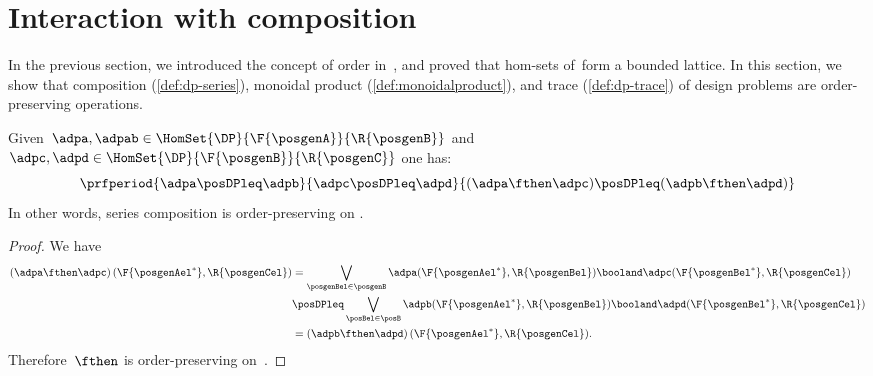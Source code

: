 
\section{Interaction with composition}
In the previous section, we introduced the concept of order in~\DP, and proved that hom-sets of~\DP form a bounded lattice.
In this section, we show that composition (\cref{def:dp-series}), monoidal product (\cref{def:monoidalproduct}), and trace (\cref{def:dp-trace}) of design problems are order-preserving operations.

\begin{lemma}
    \label{lem:series_pres_order}
    Given~$\adpa,\adpab \in \HomSet{\DP}{\F{\posgenA}}{\R{\posgenB}}$ and~$\adpc,\adpd \in \HomSet{\DP}{\F{\posgenB}}{\R{\posgenC}}$ one has:
    \begin{equation}
        \prfperiod{
            \adpa\posDPleq \adpb
        }{
            \adpc\posDPleq \adpd
        }{
            (\adpa\fthen \adpc) \posDPleq (\adpb\fthen \adpd)
        }
    \end{equation}
    In other words, series composition is order-preserving on \DP.
\end{lemma}

\begin{proof}
    We have
    \begin{equation}
        \label{eq:series_pres_ord}
        \begin{aligned}
            \left( \adpa\fthen \adpc\right)(\F{\posgenAel^*},\R{\posgenCel}) & =
            \bigvee_{\posgenBel\in \posgenB}\adpa(\F{\posgenAel^*},\R{\posgenBel})\booland \adpc(\F{\posgenBel^*},\R{\posgenCel})                                                                         \\
                                                                             & \posDPleq \bigvee_{\posBel\in \posB} \adpb(\F{\posgenAel^*},\R{\posgenBel})\booland \adpd(\F{\posgenBel^*},\R{\posgenCel}) \\
                                                                             & =\left( \adpb\fthen \adpd\right)(\F{\posgenAel^*},\R{\posgenCel}).
        \end{aligned}
    \end{equation}
    Therefore~$\fthen$ is order-preserving on~\DP.
\end{proof}

